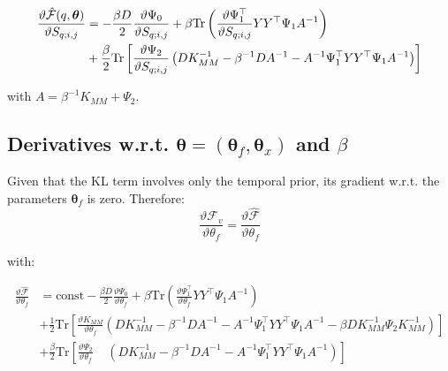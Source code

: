 \begin{align}
 \frac{\vartheta \hat{\mathcal{F}}(q, \boldsymbol \theta)}{\vartheta S_{q;i,j}}
{}& = - \frac{\beta D}{2} \frac{\vartheta \Psi_0}{\vartheta S_{q;i,j}}
    + \beta \text{Tr} \left(\frac{\vartheta \Psi_1^\top}{\vartheta S_{q;i,j}} Y Y^\top \Psi_1 A^{-1} \right) \nonumber \\
{}& + \frac{\beta}{2} \text{Tr} \left[ \frac{\vartheta \Psi_2}{\vartheta S_{q;i,j}}
       \left(
	  D K_{MM}^{-1} - \beta^{-1} D A^{-1} - A^{-1} \Psi_1^\top Y Y^\top \Psi_1 A^{-1}
       \right) \right] \label{derivFTildeEfficientComputationS}
\end{align}


with $A=\beta^{-1}K_{MM}+\Psi_2$.





\subsection{Derivatives w.r.t. $\boldsymbol \theta = (\boldsymbol \theta_f, \boldsymbol \theta_x)$ and $\beta$}
Given that the KL term involves only the temporal prior, its gradient w.r.t. the parameters $\boldsymbol \theta_f$ is zero. Therefore:
\begin{equation}
   \label{DerivativeOfFComplete}
      \frac{\vartheta \mathcal{F}_v}{\vartheta \theta_f} = \frac{\vartheta \hat{\mathcal{F}}}{\vartheta \theta_f}
\end{equation}

  with:

\begin{align}
\frac{\vartheta \hat{\mathcal{F}}}{\vartheta \theta_f} {}& = \text{const} - 
\frac{\beta D}{2} \frac{\vartheta \Psi_0}{\vartheta \theta_f}
 + \beta \text{Tr} \left(\frac{\vartheta \Psi_1^\top}{\vartheta \theta_f} Y Y^\top \Psi_1 A^{-1} \right) \nonumber \\
{}& + \frac{1}{2} \text{Tr} \left[ \frac{\vartheta K_{MM}}{\vartheta \theta_f}
        \left(
	   D K_{MM}^{-1} - \beta^{-1} D A^{-1} - A^{-1} \Psi_1^\top Y Y^\top \Psi_1 A^{-1} - \beta D K_{MM}^{-1} \Psi_2 K_{MM}^{-1} 
         \right) \right] \nonumber \\
{}& + \frac{\beta}{2} \text{Tr} \left[ \frac{\vartheta \Psi_2}{\vartheta \theta_f} \;\;\;\;
       \left(
	  D K_{MM}^{-1} - \beta^{-1} D A^{-1} - A^{-1} \Psi_1^\top Y Y^\top \Psi_1 A^{-1}
       \right) \right] \label{DerivativeOfFtildeComplete}
\end{align}

